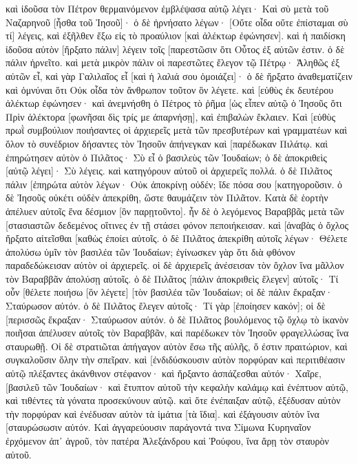 καὶ ἰδοῦσα τὸν Πέτρον θερμαινόμενον ἐμβλέψασα αὐτῷ λέγει· Καὶ σὺ μετὰ τοῦ Ναζαρηνοῦ [ἦσθα τοῦ Ἰησοῦ]· 
ὁ δὲ ἠρνήσατο λέγων· [Οὔτε οἶδα οὔτε ἐπίσταμαι σὺ τί] λέγεις, καὶ ἐξῆλθεν ἔξω εἰς τὸ προαύλιον [καὶ ἀλέκτωρ ἐφώνησεν]. 
καὶ ἡ παιδίσκη ἰδοῦσα αὐτὸν [ἤρξατο πάλιν] λέγειν τοῖς [παρεστῶσιν ὅτι Οὗτος ἐξ αὐτῶν ἐστιν. 
ὁ δὲ πάλιν ἠρνεῖτο. καὶ μετὰ μικρὸν πάλιν οἱ παρεστῶτες ἔλεγον τῷ Πέτρῳ· Ἀληθῶς ἐξ αὐτῶν εἶ, καὶ γὰρ Γαλιλαῖος εἶ [καὶ ἡ λαλιά σου ὁμοιάζει]· 
ὁ δὲ ἤρξατο ἀναθεματίζειν καὶ ὀμνύναι ὅτι Οὐκ οἶδα τὸν ἄνθρωπον τοῦτον ὃν λέγετε. 
καὶ [εὐθὺς ἐκ δευτέρου ἀλέκτωρ ἐφώνησεν· καὶ ἀνεμνήσθη ὁ Πέτρος τὸ ῥῆμα [ὡς εἶπεν αὐτῷ ὁ Ἰησοῦς ὅτι Πρὶν ἀλέκτορα [φωνῆσαι δὶς τρίς με ἀπαρνήσῃ], καὶ ἐπιβαλὼν ἔκλαιεν. 
Καὶ [εὐθὺς πρωῒ συμβούλιον ποιήσαντες οἱ ἀρχιερεῖς μετὰ τῶν πρεσβυτέρων καὶ γραμματέων καὶ ὅλον τὸ συνέδριον δήσαντες τὸν Ἰησοῦν ἀπήνεγκαν καὶ [παρέδωκαν Πιλάτῳ. 
καὶ ἐπηρώτησεν αὐτὸν ὁ Πιλᾶτος· Σὺ εἶ ὁ βασιλεὺς τῶν Ἰουδαίων; ὁ δὲ ἀποκριθεὶς [αὐτῷ λέγει]· Σὺ λέγεις. 
καὶ κατηγόρουν αὐτοῦ οἱ ἀρχιερεῖς πολλά. 
ὁ δὲ Πιλᾶτος πάλιν [ἐπηρώτα αὐτὸν λέγων· Οὐκ ἀποκρίνῃ οὐδέν; ἴδε πόσα σου [κατηγοροῦσιν. 
ὁ δὲ Ἰησοῦς οὐκέτι οὐδὲν ἀπεκρίθη, ὥστε θαυμάζειν τὸν Πιλᾶτον. 
Κατὰ δὲ ἑορτὴν ἀπέλυεν αὐτοῖς ἕνα δέσμιον [ὃν παρῃτοῦντο]. 
ἦν δὲ ὁ λεγόμενος Βαραββᾶς μετὰ τῶν [στασιαστῶν δεδεμένος οἵτινες ἐν τῇ στάσει φόνον πεποιήκεισαν. 
καὶ [ἀναβὰς ὁ ὄχλος ἤρξατο αἰτεῖσθαι [καθὼς ἐποίει αὐτοῖς. 
ὁ δὲ Πιλᾶτος ἀπεκρίθη αὐτοῖς λέγων· Θέλετε ἀπολύσω ὑμῖν τὸν βασιλέα τῶν Ἰουδαίων; 
ἐγίνωσκεν γὰρ ὅτι διὰ φθόνον παραδεδώκεισαν αὐτὸν οἱ ἀρχιερεῖς. 
οἱ δὲ ἀρχιερεῖς ἀνέσεισαν τὸν ὄχλον ἵνα μᾶλλον τὸν Βαραββᾶν ἀπολύσῃ αὐτοῖς. 
ὁ δὲ Πιλᾶτος [πάλιν ἀποκριθεὶς ἔλεγεν] αὐτοῖς· Τί οὖν [θέλετε ποιήσω [ὃν λέγετε] [τὸν βασιλέα τῶν Ἰουδαίων; 
οἱ δὲ πάλιν ἔκραξαν· Σταύρωσον αὐτόν. 
ὁ δὲ Πιλᾶτος ἔλεγεν αὐτοῖς· Τί γὰρ [ἐποίησεν κακόν]; οἱ δὲ [περισσῶς ἔκραξαν· Σταύρωσον αὐτόν. 
ὁ δὲ Πιλᾶτος βουλόμενος τῷ ὄχλῳ τὸ ἱκανὸν ποιῆσαι ἀπέλυσεν αὐτοῖς τὸν Βαραββᾶν, καὶ παρέδωκεν τὸν Ἰησοῦν φραγελλώσας ἵνα σταυρωθῇ. 
Οἱ δὲ στρατιῶται ἀπήγαγον αὐτὸν ἔσω τῆς αὐλῆς, ὅ ἐστιν πραιτώριον, καὶ συγκαλοῦσιν ὅλην τὴν σπεῖραν. 
καὶ [ἐνδιδύσκουσιν αὐτὸν πορφύραν καὶ περιτιθέασιν αὐτῷ πλέξαντες ἀκάνθινον στέφανον· 
καὶ ἤρξαντο ἀσπάζεσθαι αὐτόν· Χαῖρε, [βασιλεῦ τῶν Ἰουδαίων· 
καὶ ἔτυπτον αὐτοῦ τὴν κεφαλὴν καλάμῳ καὶ ἐνέπτυον αὐτῷ, καὶ τιθέντες τὰ γόνατα προσεκύνουν αὐτῷ. 
καὶ ὅτε ἐνέπαιξαν αὐτῷ, ἐξέδυσαν αὐτὸν τὴν πορφύραν καὶ ἐνέδυσαν αὐτὸν τὰ ἱμάτια [τὰ ἴδια]. καὶ ἐξάγουσιν αὐτὸν ἵνα [σταυρώσωσιν αὐτόν. 
Καὶ ἀγγαρεύουσιν παράγοντά τινα Σίμωνα Κυρηναῖον ἐρχόμενον ἀπ᾽ ἀγροῦ, τὸν πατέρα Ἀλεξάνδρου καὶ Ῥούφου, ἵνα ἄρῃ τὸν σταυρὸν αὐτοῦ. 
